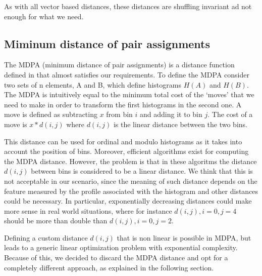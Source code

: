 As with all vector based distances, these distances are shuffling invariant ad not enough for what we need.



\subsection{Miminum distance of pair assignments}

The MDPA (minimum distance of pair assignments) is a distance function defined in \cite{histogram} that almost satisfies our requirements. To define the MDPA consider two sets of n elements, A and B, which define histograms $H(A)$ and $H(B)$. The MDPA is intuitively equal to the minimum total cost of the `moves' that we need to make in order to transform the first histograms in the second one. A move is defined as subtracting $x$ from bin $i$ and adding it to bin $j$. The cost of a move is $x * d(i, j)$ where $d(i, j)$ is the linear distance between the two bins.

This distance can be used for ordinal and modulo histograms as it takes into account the position of bins. Moreover, efficient algorithms exist for computing the MDPA distance. However, the problem is that in these algoritms the distance $d(i, j)$ between bins is considered to be a linear distance. We think that this is not acceptable in our scenario, since the meaning of such distance depends on the feature measured by the profile associated with the histogram and other distances could be necessary. In particular, exponentially decreasing distances could make more sense in real world situations, where for instance $d(i, j), i=0, j=4$ should be more than double than $d(i, j), i=0, j=2$.

Defining a custom distance $d(i, j)$ that is non linear is possible in MDPA, but leads to a generic linear optimization problem with exponential complexity. Because of this, we decided to discard the MDPA distance and opt for a completely different approach, as explained in the following section.

